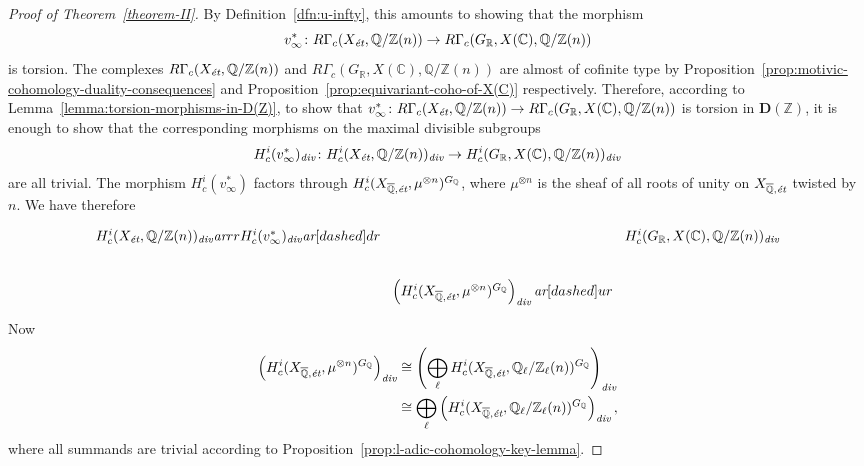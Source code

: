 \documentclass[leqno,12pt]{article}
\theoremstyle{plain}
\theoremstyle{definition}
\newcommand{\CC}{\mathbb{C}}
\newcommand{\QQ}{\mathbb{Q}}
\newcommand{\RR}{\mathbb{R}}
\newcommand{\ZZ}{\mathbb{Z}}
\renewcommand{\div}{\text{\it div}}
\newcommand{\ar}{\text{\it ar}}
\newcommand{\et}{\text{\it \'{e}t}}
\newcommand{\DZ}{{\mathbf{D} (\ZZ)}}
\begin{document}
\begin{proof}[Proof of Theorem~\ref{theorem-II}]
  By Definition~\ref{dfn:u-infty}, this amounts to showing that the morphism
  $$v_\infty^*\colon R\Gamma_c (X_\et, \QQ/\ZZ (n)) \to R\Gamma_c (G_\RR, X (\CC), \QQ/\ZZ (n))$$
  is torsion. The complexes $R\Gamma_c (X_\et, \QQ/\ZZ (n))$ and
  $R\Gamma_c (G_\RR, X (\CC), \QQ/\ZZ (n))$ are almost of cofinite type by
  Proposition~\ref{prop:motivic-cohomology-duality-consequences} and
  Proposition~\ref{prop:equivariant-coho-of-X(C)} respectively.
  Therefore, according to Lemma~\ref{lemma:torsion-morphisms-in-D(Z)}, to show
  that
  $v^*_\infty\colon R\Gamma_c (X_\et, \QQ/\ZZ (n)) \to R\Gamma_c (G_\RR, X
  (\CC), \QQ/\ZZ (n))$ is torsion in $\DZ$, it is enough to show that the
  corresponding morphisms on the maximal divisible subgroups
  \[ H^i_c (v^*_\infty)_\div\colon H^i_c (X_\et, \QQ/\ZZ (n))_\div \to
     H^i_c (G_\RR, X (\CC), \QQ/\ZZ (n))_\div \]
  are all trivial. The morphism $H^i_c (v^*_\infty)$ factors through
  $H^i_c (X_{\overline{\QQ}, \text{\it \'{e}t}}, \mu^{\otimes n})^{G_\QQ}$, where
  $\mu^{\otimes n}$ is the sheaf of all roots of unity on
  $X_{\overline{\QQ}, \text{\it \'{e}t}}$ twisted by $n$.
  We have therefore
  \[ \begin{tikzcd}[column sep=0pt]
    H^i_c (X_\et, \QQ/\ZZ (n))_\div\ar{rr}{H^i_c (v^*_\infty)_\div}\ar[dashed]{dr} && H^i_c (G_\RR, X (\CC), \QQ/\ZZ (n))_\div\\
    & \left(H^i_c (X_{\overline{\QQ}, \text{\it \'{e}t}}, \mu^{\otimes n})^{G_\QQ}\right)_\div\ar[dashed]{ur}
  \end{tikzcd} \]
  Now
  \begin{align*}
    \left(H^i_c (X_{\overline{\QQ}, \text{\it \'{e}t}}, \mu^{\otimes n})^{G_\QQ}\right)_\div & \cong
                                                                                               \left(\bigoplus_\ell H^i_c (X_{\overline{\QQ}, \text{\it \'{e}t}}, \QQ_\ell/\ZZ_\ell (n))^{G_\QQ}\right)_\div \\
                                                                                             & \cong
                                                                                               \bigoplus_\ell \left(H^i_c (X_{\overline{\QQ}, \text{\it \'{e}t}}, \QQ_\ell/\ZZ_\ell (n))^{G_\QQ}\right)_\div,
  \end{align*}
  where all summands are trivial according to
  Proposition~\ref{prop:l-adic-cohomology-key-lemma}.
\end{proof}
\end{document}
